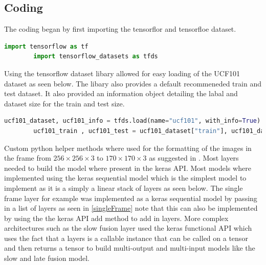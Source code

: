 \documentclass[10pt,phd,a4paper,oneside]{article}
\begin{document}
    \subsection{Coding}

    The coding began by first importing the tensorflor and tensorfloe dataset.

    \begin{lstlisting}[language=Python, caption=Importing tensorflow libaries]
        import tensorflow as tf
        import tensorflow_datasets as tfds
    \end{lstlisting}

    Using the tensorflow dataset libary allowed for easy loading of the UCF101 dataset as seen below. The libary also provides a default recommeneded train and test dataset. It also provided an information object detailing the labal and dataset size for the train and test size.

    \begin{lstlisting}[language=Python, caption=Loading UCF101 dataset]
        ucf101_dataset, ucf101_info = tfds.load(name="ucf101", with_info=True)
        ucf101_train , ucf101_test = ucf101_dataset["train"], ucf101_dataset["test"]
    \end{lstlisting}

    Custom python helper methods where used for the formatting of the images in the frame from $256 \times 256 \times 3$ to $170 \times170 \times 3$ as suggested in \citep{KarpathyCVPR14}. Most layers needed to build the model where present in the keras API. Most models where implemented using the keras sequential model which is the simplest model to implement as it is a simply a linear stack of layers as seen below. The single frame layer for example was implemented as a keras sequential model by passing in a list of layers as seen in \ref{singleFrame} note that this can also be implemented by using the the keras API add method to add in layers. More complex architectures such as the slow fusion layer used the keras functional API which uses the fact that a layers is a callable instance that can be called on a tensor and then returns a tensor to build multi-output and multi-input models like the slow and late fusion model.
\end{document}

